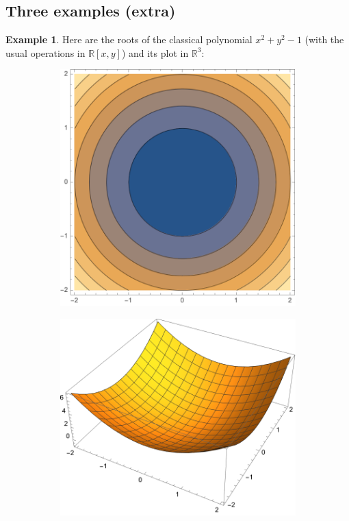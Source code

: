 \documentclass{article}
\theoremstyle{definition}
\newtheorem{ex}{Example}
\newcommand{\R}{\mathbb{R}}
\begin{document}
\subsection{Three examples (extra)}
\begin{ex}
	Here are the roots of the classical polynomial $x^2+y^2-1$ (with the usual operations in $\R[x,y]$) and its plot in $\R^3$:
	\begin{figure}[H]
		\begin{subfigure}{.5\textwidth}
			\centering
			\includegraphics[width=0.9\linewidth]{dani1}
		\end{subfigure}
		\begin{subfigure}{.5\textwidth}
			\centering
			\includegraphics[width=0.9\linewidth]{dani2}

\end{subfigure}
\end{figure}
\end{ex}
\end{document}
